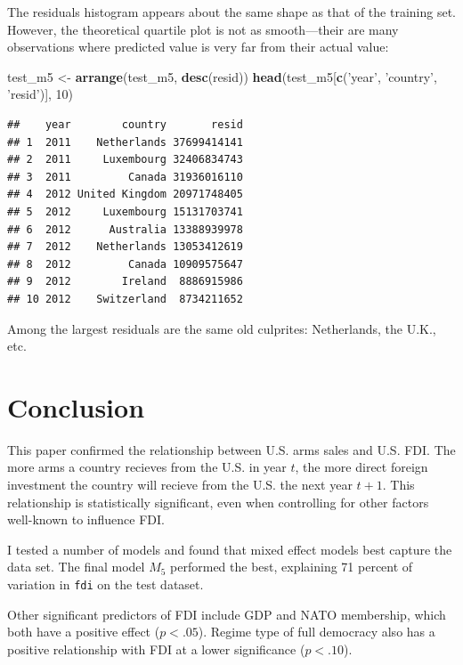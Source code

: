 \documentclass[11pt,]{article}
\newenvironment{Shaded}{\begin{snugshade}}{\end{snugshade}}
\newcommand{\DecValTok}[1]{\textcolor[rgb]{0.00,0.00,0.81}{#1}}
\newcommand{\KeywordTok}[1]{\textcolor[rgb]{0.13,0.29,0.53}{\textbf{#1}}}
\newcommand{\NormalTok}[1]{#1}
\newcommand{\StringTok}[1]{\textcolor[rgb]{0.31,0.60,0.02}{#1}}
\begin{document}
The residuals histogram appears about the same shape as that of the
training set. However, the theoretical quartile plot is not as
smooth---their are many observations where predicted value is very far
from their actual value:

\begin{Shaded}
\begin{Highlighting}[]
\NormalTok{test_m5 <-}\StringTok{ }\KeywordTok{arrange}\NormalTok{(test_m5, }\KeywordTok{desc}\NormalTok{(resid))}
\KeywordTok{head}\NormalTok{(test_m5[}\KeywordTok{c}\NormalTok{(}\StringTok{'year'}\NormalTok{, }\StringTok{'country'}\NormalTok{, }\StringTok{'resid'}\NormalTok{)], }\DecValTok{10}\NormalTok{)}
\end{Highlighting}
\end{Shaded}

\begin{verbatim}
##    year        country       resid
## 1  2011    Netherlands 37699414141
## 2  2011     Luxembourg 32406834743
## 3  2011         Canada 31936016110
## 4  2012 United Kingdom 20971748405
## 5  2012     Luxembourg 15131703741
## 6  2012      Australia 13388939978
## 7  2012    Netherlands 13053412619
## 8  2012         Canada 10909575647
## 9  2012        Ireland  8886915986
## 10 2012    Switzerland  8734211652
\end{verbatim}

Among the largest residuals are the same old culprites: Netherlands, the
U.K., etc.

\hypertarget{conclusion}{%
\section{Conclusion}\label{conclusion}}

This paper confirmed the relationship between U.S. arms sales and U.S.
FDI. The more arms a country recieves from the U.S. in year \(t\), the
more direct foreign investment the country will recieve from the U.S.
the next year \(t+1\). This relationship is statistically significant,
even when controlling for other factors well-known to influence FDI.

I tested a number of models and found that mixed effect models best
capture the data set. The final model \(M_5\) performed the best,
explaining 71 percent of variation in \texttt{fdi} on the test dataset.

Other significant predictors of FDI include GDP and NATO membership,
which both have a positive effect (\(p < .05\)). Regime type of full
democracy also has a positive relationship with FDI at a lower
significance (\(p < .10\)).
\end{document}
